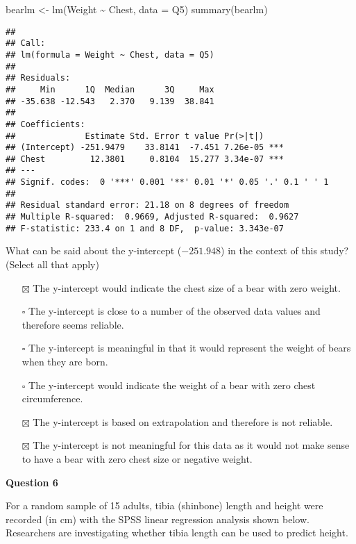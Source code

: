 \documentclass[
]{article}
\newenvironment{Shaded}{\begin{snugshade}}{\end{snugshade}}
\newcommand{\AttributeTok}[1]{\textcolor[rgb]{0.77,0.63,0.00}{#1}}
\newcommand{\FunctionTok}[1]{\textcolor[rgb]{0.00,0.00,0.00}{#1}}
\newcommand{\NormalTok}[1]{#1}
\newcommand{\OtherTok}[1]{\textcolor[rgb]{0.56,0.35,0.01}{#1}}
\newcommand{\SpecialCharTok}[1]{\textcolor[rgb]{0.00,0.00,0.00}{#1}}
\providecommand{\tightlist}{%
  \setlength{\itemsep}{0pt}\setlength{\parskip}{0pt}}
\begin{document}
\begin{Shaded}
\begin{Highlighting}[]
\NormalTok{bearlm }\OtherTok{\textless{}{-}} \FunctionTok{lm}\NormalTok{(Weight }\SpecialCharTok{\textasciitilde{}}\NormalTok{ Chest, }\AttributeTok{data =}\NormalTok{ Q5)}
\FunctionTok{summary}\NormalTok{(bearlm)}
\end{Highlighting}
\end{Shaded}

\begin{verbatim}
## 
## Call:
## lm(formula = Weight ~ Chest, data = Q5)
## 
## Residuals:
##     Min      1Q  Median      3Q     Max 
## -35.638 -12.543   2.370   9.139  38.841 
## 
## Coefficients:
##              Estimate Std. Error t value Pr(>|t|)    
## (Intercept) -251.9479    33.8141  -7.451 7.26e-05 ***
## Chest         12.3801     0.8104  15.277 3.34e-07 ***
## ---
## Signif. codes:  0 '***' 0.001 '**' 0.01 '*' 0.05 '.' 0.1 ' ' 1
## 
## Residual standard error: 21.18 on 8 degrees of freedom
## Multiple R-squared:  0.9669, Adjusted R-squared:  0.9627 
## F-statistic: 233.4 on 1 and 8 DF,  p-value: 3.343e-07
\end{verbatim}

What can be said about the y-intercept (\(-251.948\)) in the context of
this study? (Select all that apply)

\begin{itemize}
\tightlist
\item[$\boxtimes$]
  The y-intercept would indicate the chest size of a bear with zero
  weight.
\item[$\square$]
  The y-intercept is close to a number of the observed data values and
  therefore seems reliable.
\item[$\square$]
  The y-intercept is meaningful in that it would represent the weight of
  bears when they are born.
\item[$\square$]
  The y-intercept would indicate the weight of a bear with zero chest
  circumference.\\
\item[$\boxtimes$]
  The y-intercept is based on extrapolation and therefore is not
  reliable.
\item[$\boxtimes$]
  The y-intercept is not meaningful for this data as it would not make
  sense to have a bear with zero chest size or negative weight.
\end{itemize}

\textbf{Question 6}

For a random sample of 15 adults, tibia (shinbone) length and height
were recorded (in cm) with the SPSS linear regression analysis shown
below. Researchers are investigating whether tibia length can be used to
predict height.
\end{document}
